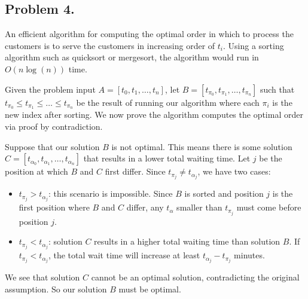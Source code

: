 \documentclass[11pt, letterpaper, titlepage]{article}
\begin{document}
\newpage

\subsection*{Problem 4.}
An efficient algorithm for computing the optimal order in which to process the customers is to serve the customers in increasing order of $t_i$. Using a sorting algorithm such as quicksort or mergesort, the algorithm would run in $O(n\log(n))$ time. 

Given the problem input $A = [ t_0, t_1, \ldots, t_n ]$, let $B = [ t_{\pi_0}, t_{\pi_1}, \ldots, t_{\pi_n} ]$ such that $t_{\pi_0} \leq t_{\pi_1} \leq \ldots \leq t_{\pi_n}$ be the result of running our algorithm where each $\pi_i$ is the new index after sorting. We now prove the algorithm computes the optimal order via proof by contradiction.

Suppose that our solution $B$ is not optimal. This means there is some solution $C = [ t_{\alpha_0}, t_{\alpha_1}, \ldots, t_{\alpha_n} ]$ that results in a lower total waiting time. Let $j$ be the position at which $B$ and $C$ first differ. Since $t_{\pi_j} \neq t_{\alpha_j}$, we have two cases:
\begin{itemize}
    \item $t_{\pi_j} > t_{\alpha_j}$: this scenario is impossible. Since $B$ is sorted and position $j$ is the first position where $B$ and $C$ differ, any $t_{\alpha}$ smaller than $t_{\pi_j}$ must come before position $j$.
    \item $t_{\pi_j} < t_{\alpha_j}$: solution $C$ results in a higher total waiting time than solution $B$. If $t_{\pi_j} < t_{\alpha_j}$, the total wait time will increase at least $t_{\alpha_j} - t_{\pi_j}$ minutes.
\end{itemize}
We see that solution $C$ cannot be an optimal solution, contradicting the original assumption. So our solution $B$ must be optimal.
\end{document}
